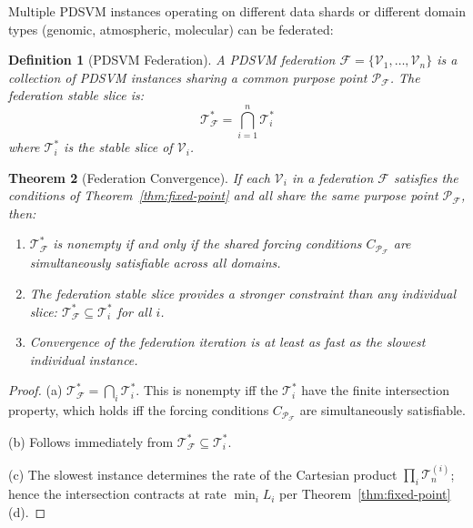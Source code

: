 \documentclass[10pt,twocolumn]{article}
\newtheorem{theorem}{Theorem}[section]
\newtheorem{definition}[theorem]{Definition}
\newcommand{\TruthCell}{\mathcal{T}}
\newcommand{\PurposePoint}{\mathcal{P}}
\begin{document}
Multiple PDSVM instances operating on different data shards or different
domain types (genomic, atmospheric, molecular) can be federated:

\begin{definition}[PDSVM Federation]
\label{def:federation}
A \emph{PDSVM federation} $\mathcal{F} = \{\mathcal{V}_1, \ldots, \mathcal{V}_n\}$
is a collection of PDSVM instances sharing a common purpose point
$\PurposePoint_\mathcal{F}$. The \emph{federation stable slice} is:
\begin{equation}
\TruthCell^*_\mathcal{F} = \bigcap_{i=1}^n \TruthCell^*_i
\label{eq:federation-slice}
\end{equation}
where $\TruthCell^*_i$ is the stable slice of $\mathcal{V}_i$.
\end{definition}

\begin{theorem}[Federation Convergence]
\label{thm:federation}
If each $\mathcal{V}_i$ in a federation $\mathcal{F}$ satisfies the
conditions of Theorem~\ref{thm:fixed-point} and all share the same
purpose point $\PurposePoint_\mathcal{F}$, then:
\begin{enumerate}[label=(\alph*)]
\item $\TruthCell^*_\mathcal{F}$ is nonempty if and only if the
      shared forcing conditions $C_{\PurposePoint_\mathcal{F}}$
      are simultaneously satisfiable across all domains.
\item The federation stable slice provides a stronger constraint
      than any individual slice:
      $\TruthCell^*_\mathcal{F} \subseteq \TruthCell^*_i$ for all $i$.
\item Convergence of the federation iteration is at least as fast as
      the slowest individual instance.
\end{enumerate}
\end{theorem}

\begin{proof}
(a) $\TruthCell^*_\mathcal{F} = \bigcap_i \TruthCell^*_i$.
This is nonempty iff the $\TruthCell^*_i$ have the finite intersection property,
which holds iff the forcing conditions $C_{\PurposePoint_\mathcal{F}}$
are simultaneously satisfiable.

(b) Follows immediately from $\TruthCell^*_\mathcal{F} \subseteq \TruthCell^*_i$.

(c) The slowest instance determines the rate of the Cartesian product
$\prod_i \TruthCell_n^{(i)}$; hence the intersection contracts
at rate $\min_i L_i$ per Theorem~\ref{thm:fixed-point}(d).
\end{proof}
\end{document}
